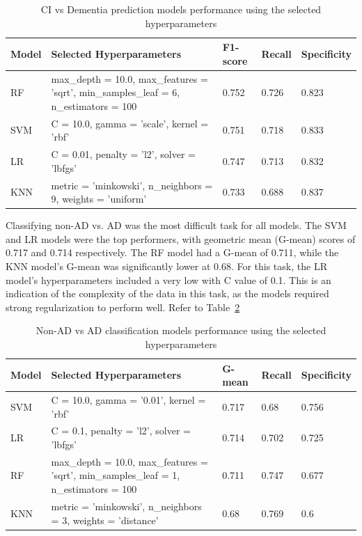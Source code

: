 \begin{table}[!ht]
    \centering
    \caption{CI vs Dementia prediction models performance using the selected hyperparameters}
    \begin{tabular}{|l|p{5cm}|l|l|l|}
    \hline
        Model & Selected Hyperparameters & F1-score & Recall & Specificity \\ \hline
        RF & max\_depth = 10.0, max\_features = 'sqrt', min\_samples\_leaf = 6, n\_estimators = 100 & 0.752 & 0.726 & 0.823 \\ \hline
        SVM & C = 10.0, gamma = 'scale', kernel = 'rbf' & 0.751 & 0.718 & 0.833 \\ \hline
        LR & C = 0.01, penalty = 'l2', solver = 'lbfgs' & 0.747 & 0.713 & 0.832 \\ \hline
        KNN & metric = 'minkowski', n\_neighbors = 9, weights = 'uniform' & 0.733 & 0.688 & 0.837 \\ \hline
    \end{tabular}
    \label{table:hyperparameter-resutls-task4}
\end{table}

Classifying non-AD vs. AD was the most difficult task for all models. The SVM and LR models were the top performers, with geometric mean (\acrshort{G-mean}) scores of 0.717 and 0.714 respectively. The RF model had a G-mean of 0.711, while the KNN model's G-mean was significantly lower at 0.68. For this task, the LR model's hyperparameters included a very low with C value of 0.1. This is an indication of the complexity of the data in this task, as the models required strong regularization to perform well. Refer to Table~\ref{table:hyperparameter-resutls-task5}

\begin{table}[!ht]
    \centering
    \caption{Non-AD vs AD classification models performance using the selected hyperparameters}
    \begin{tabular}{|l|p{5cm}|l|l|l|}
    \hline
        Model & Selected Hyperparameters & G-mean & Recall & Specificity \\ \hline
        SVM & C = 10.0, gamma = '0.01', kernel = 'rbf' & 0.717 & 0.68 & 0.756 \\ \hline
        LR & C = 0.1, penalty = 'l2', solver = 'lbfgs' & 0.714 & 0.702 & 0.725 \\ \hline
        RF & max\_depth = 10.0, max\_features = 'sqrt', min\_samples\_leaf = 1, n\_estimators = 100 & 0.711 & 0.747 & 0.677 \\ \hline
        KNN & metric = 'minkowski', n\_neighbors = 3, weights = 'distance' & 0.68 & 0.769 & 0.6 \\ \hline
    \end{tabular}
    \label{table:hyperparameter-resutls-task5}
\end{table}

